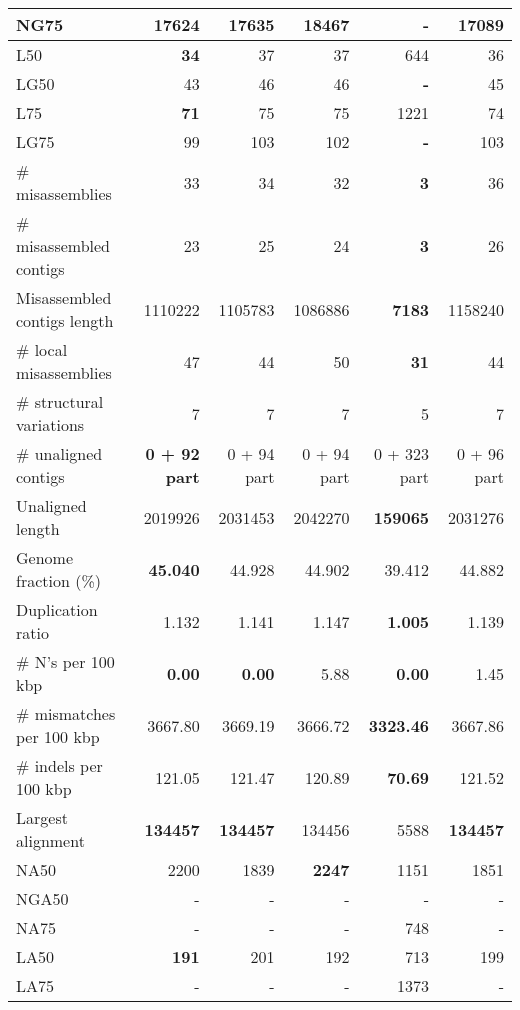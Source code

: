 \documentclass[12pt,a4paper]{article}
\begin{document}
\begin{table}[ht]
\begin{center}
\begin{tabular}{|l*{5}{|r}|}
NG75 & 17624 & 17635 & {\bf 18467} & - & 17089 \\ \hline
L50 & {\bf 34} & 37 & 37 & 644 & 36 \\ \hline
LG50 & 43 & 46 & 46 & {\bf -} & 45 \\ \hline
L75 & {\bf 71} & 75 & 75 & 1221 & 74 \\ \hline
LG75 & 99 & 103 & 102 & {\bf -} & 103 \\ \hline
\# misassemblies & 33 & 34 & 32 & {\bf 3} & 36 \\ \hline
\# misassembled contigs & 23 & 25 & 24 & {\bf 3} & 26 \\ \hline
Misassembled contigs length & 1110222 & 1105783 & 1086886 & {\bf 7183} & 1158240 \\ \hline
\# local misassemblies & 47 & 44 & 50 & {\bf 31} & 44 \\ \hline
\# structural variations & 7 & 7 & 7 & 5 & 7 \\ \hline
\# unaligned contigs & {\bf 0 + 92 part} & 0 + 94 part & 0 + 94 part & 0 + 323 part & 0 + 96 part \\ \hline
Unaligned length & 2019926 & 2031453 & 2042270 & {\bf 159065} & 2031276 \\ \hline
Genome fraction (\%) & {\bf 45.040} & 44.928 & 44.902 & 39.412 & 44.882 \\ \hline
Duplication ratio & 1.132 & 1.141 & 1.147 & {\bf 1.005} & 1.139 \\ \hline
\# N's per 100 kbp & {\bf 0.00} & {\bf 0.00} & 5.88 & {\bf 0.00} & 1.45 \\ \hline
\# mismatches per 100 kbp & 3667.80 & 3669.19 & 3666.72 & {\bf 3323.46} & 3667.86 \\ \hline
\# indels per 100 kbp & 121.05 & 121.47 & 120.89 & {\bf 70.69} & 121.52 \\ \hline
Largest alignment & {\bf 134457} & {\bf 134457} & 134456 & 5588 & {\bf 134457} \\ \hline
NA50 & 2200 & 1839 & {\bf 2247} & 1151 & 1851 \\ \hline
NGA50 & - & - & - & - & - \\ \hline
NA75 & - & - & - & 748 & - \\ \hline
LA50 & {\bf 191} & 201 & 192 & 713 & 199 \\ \hline
LA75 & - & - & - & 1373 & - \\ \hline
\end{tabular}
\end{center}
\end{table}
\end{document}
